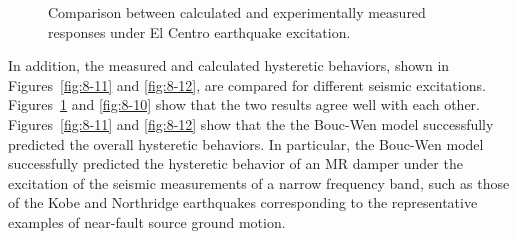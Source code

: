 \begin{figure}[H]
\centering
{}
\caption{Comparison between calculated and experimentally measured responses under El Centro earthquake excitation.}
\label{fig:8-9}
\end{figure}

In addition, the measured and calculated hysteretic behaviors, shown in Figures~\ref{fig:8-11} and \ref{fig:8-12}, are compared for different seismic excitations. Figures~\ref{fig:8-9} and \ref{fig:8-10} show that the two results agree well with each other. Figures~\ref{fig:8-11} and \ref{fig:8-12} show that the the Bouc-Wen model successfully predicted the overall hysteretic behaviors. In particular, the Bouc-Wen model successfully predicted the hysteretic behavior of an MR damper under the excitation of the seismic measurements of a narrow frequency band, such as those of the Kobe and Northridge earthquakes corresponding to the representative examples of near-fault source ground motion.

